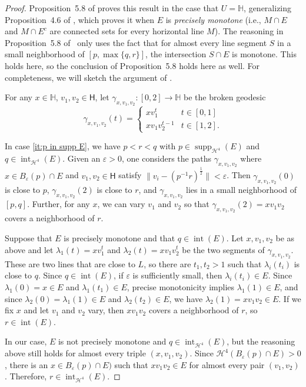 \documentclass[11pt,reqno]{amsart}
\renewcommand{\H}{\mathbb{H}}
\newcommand{\cH}{\mathcal{H}}
\renewcommand{\epsilon}{\varepsilon}
\newcommand{\0}{\mathbf{0}}
\renewcommand{\1}{\mathbf 1}
\newcommand{\from}{\colon}
\theoremstyle{remark}
\DeclareMathOperator{\inter}{int}
\DeclareMathOperator{\supp}{supp}
\begin{document}
\begin{proof}
  Proposition~5.8 of \cite{CheegerKleinerMetricDiff} proves this result in the case that $U=\H$, generalizing Proposition~4.6 of \cite{CheegerKleinerMetricDiff}, which proves it when $E$ is \emph{precisely monotone} (i.e., $M\cap E$ and $M\cap E^c$ are connected sets for every horizontal line $M$). The reasoning in Proposition~5.8 of~\cite{CheegerKleinerMetricDiff} only uses the fact that for almost every line segment $S$ in a small neighborhood of $[p,\max\{q,r\}]$, the intersection $S\cap E$ is monotone. This holds here, so the conclusion of Proposition~5.8 holds here as well.
  For completeness, we will sketch the argument of \cite{CheegerKleinerMetricDiff}.

  For any $x\in \H$, $v_1,v_2\in \mathsf{H}$, let $\gamma_{x,v_1,v_2}\from [0,2]\to \H$ be the broken geodesic
  $$\gamma_{x,v_1,v_2}(t)=\begin{cases}
    x v_1^t & t\in [0,1] \\
    x v_1 v_2^{t-1} & t\in [1,2].
  \end{cases}$$

  In case \eqref{it:p in supp E}, we have $p<r< q$ with $p\in \supp_{\cH^4}(E)$ and $q\in \inter_{\cH^4}(E)$. Given an $\epsilon>0$, one considers the paths $\gamma_{x,v_1,v_2}$ where $x\in B_\epsilon(p)\cap E$ and $v_1,v_2\in \mathsf{H}$ satisfy $\|v_i-(p^{-1}r)^{\frac{1}{2}}\|<\epsilon$. Then $\gamma_{x,v_1,v_2}(0)$ is close to $p$, $\gamma_{x,v_1,v_2}(2)$ is close to $r$, and $\gamma_{x,v_1,v_2}$ lies in a small neighborhood of $[p,q]$. Further, for any $x$, we can vary $v_1$ and $v_2$ so that $\gamma_{x,v_1,v_2}(2)=xv_1v_2$ covers a neighborhood of $r$.

  Suppose that $E$ is precisely monotone and that $q\in \inter(E)$. Let $x, v_1, v_2$ be as above and let $\lambda_1(t)=xv_1^t$ and $\lambda_2(t)=xv_1v_2^t$ be the two segments of $\gamma_{x,v_1,v_2}$. These are two lines that are close to $L$, so there are $t_1,t_2>1$ such that $\lambda_i(t_i)$ is close to $q$. Since $q\in \inter(E)$, if $\epsilon$ is sufficiently small, then $\lambda_i(t_i)\in E$. Since $\lambda_1(0)=x\in E$ and $\lambda_1(t_1)\in E$, precise monotonicity implies $\lambda_1(1)\in E$, and since $\lambda_2(0)=\lambda_1(1)\in E$ and $\lambda_2(t_2)\in E$, we have $\lambda_2(1)=xv_1v_2\in E$.  If we fix $x$ and let $v_1$ and $v_2$ vary, then $xv_1v_2$ covers a neighborhood of $r$, so $r\in \inter(E)$.

  In our case, $E$ is not precisely monotone and $q\in \inter_{\cH^4}(E)$, but the reasoning above still holds for almost every triple $(x, v_1, v_2)$. Since $\cH^4(B_\epsilon(p)\cap E)>0$, there is an $x\in B_\epsilon(p)\cap E)$ such that $xv_1v_2\in E$ for almost every pair $(v_1,v_2)$. Therefore, $r\in \inter_{\cH^4}(E)$.


\end{proof}
\end{document}
